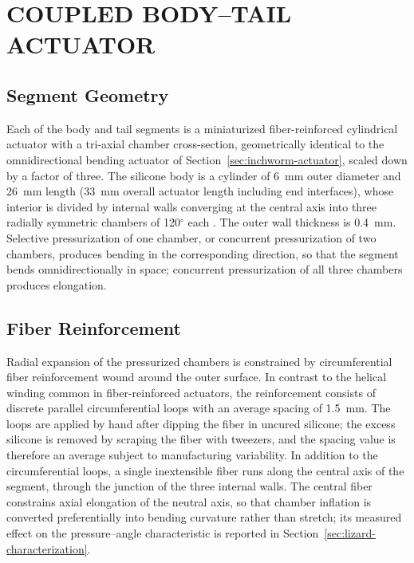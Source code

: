 

\section{COUPLED BODY--TAIL ACTUATOR}
\label{sec:lizard-bodytail}

\subsection{Segment Geometry}

Each of the body and tail segments is a miniaturized fiber-reinforced
cylindrical actuator with a tri-axial chamber cross-section, geometrically
identical to the omnidirectional bending actuator of
Section~\ref{sec:inchworm-actuator}, scaled down by a factor of three. The
silicone body is a cylinder of 6~mm outer diameter and 26~mm length
(33~mm overall actuator length including end interfaces), whose interior
is divided by internal walls converging at the central axis into three
radially symmetric chambers of 120$^{\circ}$ each
\cite{Yan2016ThreeChamber,Moutousi2024Omnidirectional}. The outer wall
thickness is 0.4~mm. Selective pressurization of one chamber, or
concurrent pressurization of two chambers, produces bending in the
corresponding direction, so that the segment bends omnidirectionally in
space; concurrent pressurization of all three chambers produces
elongation.

\subsection{Fiber Reinforcement}

Radial expansion of the pressurized chambers is constrained by
circumferential fiber reinforcement wound around the outer surface. In
contrast to the helical winding common in fiber-reinforced actuators, the
reinforcement consists of discrete parallel circumferential loops with an
average spacing of 1.5~mm. The loops are applied by hand after dipping
the fiber in uncured silicone; the excess silicone is removed
by scraping the fiber with tweezers, and the spacing value is therefore
an average subject to manufacturing variability. In addition to the
circumferential loops, a single inextensible fiber runs along the central
axis of the segment, through the junction of the three internal walls.
The central fiber constrains axial elongation of the neutral axis, so
that chamber inflation is converted preferentially into bending curvature
rather than stretch; its measured effect on the pressure--angle
characteristic is reported in Section~\ref{sec:lizard-characterization}.

